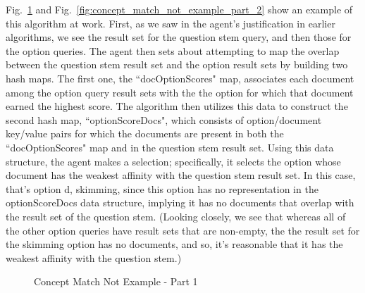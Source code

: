 Fig.~\ref{fig:concept_match_not_example_part_1} and Fig.~\ref{fig:concept_match_not_example_part_2} show an example of this algorithm at work.  First, as we saw in the agent's justification in earlier algorithms, we see the result set for the question stem query, and then those for the option queries.  The agent then sets about attempting to map the overlap between the question stem result set and the option result sets by building two hash maps.  The first one, the ``docOptionScores" map, associates each document among the option query result sets with the the option for which that document earned the highest score.  The algorithm then utilizes this data to construct the second hash map, ``optionScoreDocs", which consists of option/document key/value pairs for which the documents are present in both the ``docOptionScores" map and in the question stem result set.  Using this data structure, the agent makes a selection; specifically, it selects the option whose document has the weakest affinity with the question stem result set.  In this case, that's option d, skimming, since this option has no representation in the optionScoreDocs data structure, implying it has no documents that overlap with the result set of the question stem.  (Looking closely, we see that whereas all of the other option queries have result sets that are non-empty, the the result set for the skimming option has no documents, and so, it's reasonable that it has the weakest affinity with the question stem.) 



\begin{figure}
\centering
\vspace{0.75in}
\caption{Concept Match Not Example - Part 1}
\label{fig:concept_match_not_example_part_1}
\end{figure}

